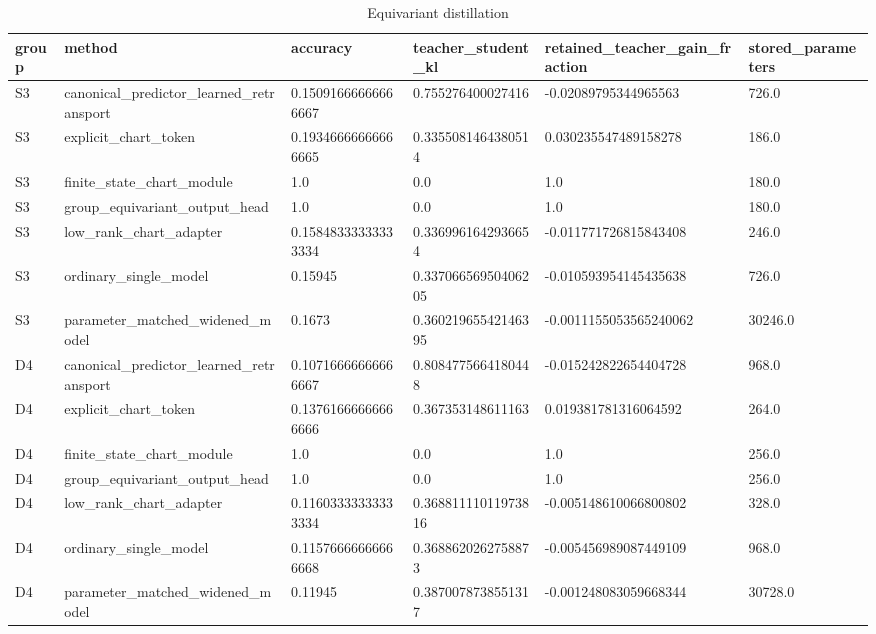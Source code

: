 \begin{table}[t]
\centering
\caption{Equivariant distillation}
\begin{tabular}{llllll}
\toprule
group & method & accuracy & teacher\_student\_kl & retained\_teacher\_gain\_fraction & stored\_parameters \\
\midrule
S3 & canonical\_predictor\_learned\_retransport & 0.15091666666666667 & 0.755276400027416 & -0.02089795344965563 & 726.0 \\
S3 & explicit\_chart\_token & 0.19346666666666665 & 0.3355081464380514 & 0.030235547489158278 & 186.0 \\
S3 & finite\_state\_chart\_module & 1.0 & 0.0 & 1.0 & 180.0 \\
S3 & group\_equivariant\_output\_head & 1.0 & 0.0 & 1.0 & 180.0 \\
S3 & low\_rank\_chart\_adapter & 0.15848333333333334 & 0.3369961642936654 & -0.011771726815843408 & 246.0 \\
S3 & ordinary\_single\_model & 0.15945 & 0.33706656950406205 & -0.010593954145435638 & 726.0 \\
S3 & parameter\_matched\_widened\_model & 0.1673 & 0.36021965542146395 & -0.0011155053565240062 & 30246.0 \\
D4 & canonical\_predictor\_learned\_retransport & 0.10716666666666667 & 0.8084775664180448 & -0.015242822654404728 & 968.0 \\
D4 & explicit\_chart\_token & 0.13761666666666666 & 0.367353148611163 & 0.019381781316064592 & 264.0 \\
D4 & finite\_state\_chart\_module & 1.0 & 0.0 & 1.0 & 256.0 \\
D4 & group\_equivariant\_output\_head & 1.0 & 0.0 & 1.0 & 256.0 \\
D4 & low\_rank\_chart\_adapter & 0.11603333333333334 & 0.36881111011973816 & -0.005148610066800802 & 328.0 \\
D4 & ordinary\_single\_model & 0.11576666666666668 & 0.3688620262758873 & -0.005456989087449109 & 968.0 \\
D4 & parameter\_matched\_widened\_model & 0.11945 & 0.3870078738551317 & -0.001248083059668344 & 30728.0 \\
\bottomrule
\end{tabular}
\end{table}
